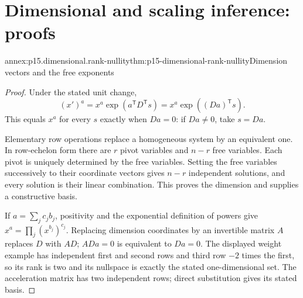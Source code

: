 \section{Dimensional and scaling inference: proofs}
\label{sec:annex-p15-dimensional-and-scaling-inference}

\begin{annexitem}{annex:p15.dimensional.rank-nullity}{thm:p15-dimensional-rank-nullity}{Dimension vectors and the free exponents}
\begin{proof}
Under the stated unit change,
\[
 (x')^a=x^a\exp(a^{\mathsf T}D^{\mathsf T}s)
        =x^a\exp((Da)^{\mathsf T}s).
\]
This equals \(x^a\) for every \(s\) exactly when \(Da=0\):
if \(Da\ne0\), take \(s=Da\).

Elementary row operations replace a homogeneous system by an equivalent
one. In row-echelon form there are \(r\) pivot variables and \(n-r\)
free variables. Each pivot is uniquely determined by the free variables.
Setting the free variables successively to their coordinate vectors gives
\(n-r\) independent solutions, and every solution is their linear
combination. This proves the dimension and supplies a constructive basis.

If \(a=\sum_jc_jb_j\), positivity and the exponential definition of powers
give \(x^a=\prod_j(x^{b_j})^{c_j}\). Replacing dimension coordinates
by an invertible matrix \(A\) replaces \(D\) with \(AD\);
\(ADa=0\) is equivalent to \(Da=0\).
The displayed weight example has independent first and second rows and
third row \(-2\) times the first, so its rank is two and its nullspace
is exactly the stated one-dimensional set. The acceleration matrix has
two independent rows; direct substitution gives its stated basis.
\end{proof}
\end{annexitem}


